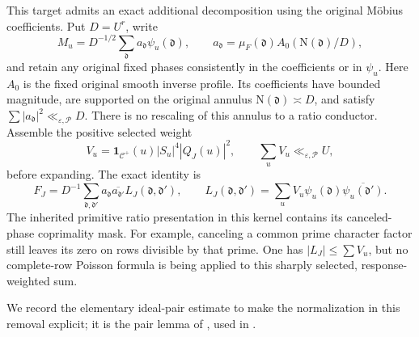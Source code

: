 \documentclass[11pt]{article}
\theoremstyle{definition}
\newcommand{\N}{\mathrm N}
\newcommand{\eps}{\varepsilon}
\newcommand{\Id}{\mathbf 1}
\newcommand{\Cplus}{\mathcal C^+}
\newcommand{\lls}{\ll_{\eps,\mathcal P}}
\begin{document}
This target admits an exact additional decomposition using the original
Möbius coefficients.  Put \(D=U^r\), write
\begin{equation}
 M_u=D^{-1/2}\sum_{\mathfrak d}a_{\mathfrak d}
                              \psi_u(\mathfrak d),\qquad
 a_{\mathfrak d}=\mu_F(\mathfrak d)
                         A_0(\N(\mathfrak d)/D),
 \label{eq:actual-inverse-coefficients-direct}
\end{equation}
and retain any original fixed phases consistently in the coefficients
or in \(\psi_u\).  Here \(A_0\) is the fixed original smooth inverse
profile.  Its coefficients have bounded magnitude, are supported on
the original annulus \(\N(\mathfrak d)\asymp D\), and satisfy
\(\sum|a_{\mathfrak d}|^2\lls D\).  There is no rescaling of this
annulus to a ratio conductor.  Assemble the positive selected weight
\begin{equation}
 V_u=\Id_{\Cplus}(u)|S_u|^4|Q_J(u)|^2,
 \qquad \sum_uV_u\lls U,
 \label{eq:actual-positive-fourth-weight}
\end{equation}
before expanding.  The exact identity is
\begin{equation}
 F_J=D^{-1}\sum_{\mathfrak d,\mathfrak d'}
       a_{\mathfrak d}\overline{a_{\mathfrak d'}}
       L_J(\mathfrak d,\mathfrak d'),\qquad
 L_J(\mathfrak d,\mathfrak d')
       =\sum_uV_u\psi_u(\mathfrak d)
                        \overline{\psi_u(\mathfrak d')}.
 \label{eq:exact-inverse-ratio-expansion}
\end{equation}
The inherited primitive ratio presentation in this kernel contains its
canceled-phase coprimality mask.  For example, canceling a common prime
character factor still leaves its zero on rows divisible by that prime.
One has \(|L_J|\le\sum V_u\), but no complete-row Poisson formula is
being applied to this sharply selected, response-weighted sum.

We record the elementary ideal-pair estimate to make the normalization
in this removal explicit; it is the pair lemma of
\cite{amplification}, used in \cite{n7}.
\end{document}
